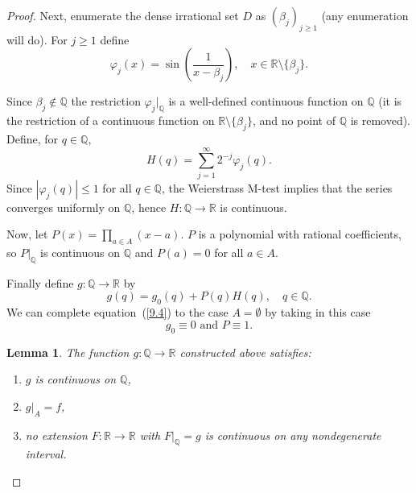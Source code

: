 \documentclass[10pt,a4paper]{amsart}
\newtheorem{lemma}{Lemma}
\begin{document}
\begin{proof}

Next, enumerate the dense irrational set $D$ as $(\beta_{j})_{j\ge1}$ (any enumeration will do). For $j\ge1$ define
\begin{equation} 
\varphi_{j}(x)=\sin\left(\frac{1}{x-\beta_{j}}\right), \quad x\in\mathbb{R}\setminus\{\beta_{j}\}. \end{equation} 

Since $\beta_{j}\notin\mathbb{Q}$ the restriction $\varphi_{j}|_{\mathbb{Q}}$ is a well-defined continuous function on $\mathbb{Q}$ (it is the restriction of a continuous function on $\mathbb{R}\setminus\{\beta_{j}\}$, and no point of $\mathbb{Q}$ is removed). Define, for $q\in\mathbb{Q}$,
\begin{equation} 
H(q)=\sum_{j=1}^{\infty}2^{-j}\varphi_{j}(q). 
\end{equation} 
Since $|\varphi_{j}(q)|\le1$ for all $q\in\mathbb{Q}$, the Weierstrass M-test implies that the series converges uniformly on $\mathbb{Q}$, hence $H:\mathbb{Q}\rightarrow\mathbb{R}$ is continuous.

\vspace{0.2cm}

Now, let $P(x)=\prod_{a\in A}(x-a).$ $P$ is a polynomial with rational coefficients, so $P|_{\mathbb{Q}}$ is continuous on $\mathbb{Q}$ and $P(a)=0$ for all $a\in A$. 

Finally define $g:\mathbb{Q}\rightarrow\mathbb{R}$ by
\begin{equation} g(q)=g_{0}(q)+P(q)H(q), \quad q\in\mathbb{Q}. 
\label{9.4} 
\end{equation} 
We can complete equation~(\ref{9.4}) to the case $A=\emptyset$ by taking in this case
\begin{equation} 
g_0\equiv 0\mbox{ and }P\equiv 1. 
\end{equation} 

\begin{lemma}
\label{thm:5.5}
The function $g:\mathbb{Q}\rightarrow\mathbb{R}$ constructed above satisfies:
\begin{enumerate}
    \item[(1)] $g$ is continuous on $\mathbb{Q}$,
    \item[(2)] $g|_{A}=f$,
    \item[(3)] no extension $F:\mathbb{R}\rightarrow\mathbb{R}$ with $F|_{\mathbb{Q}}=g$ is continuous on any nondegenerate interval.
\end{enumerate}
\end{lemma}



\end{proof}
\end{document}
